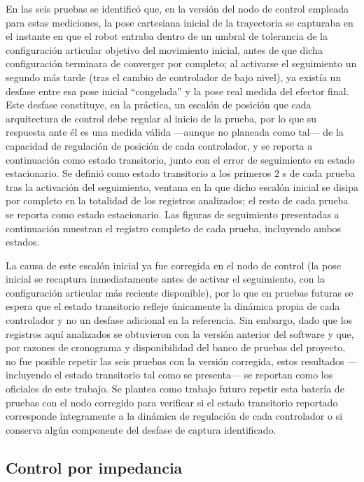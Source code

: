 En las seis pruebas se identificó que, en la versión del nodo de control
empleada para estas mediciones, la pose cartesiana inicial de la trayectoria
se capturaba en el instante en que el robot entraba dentro de un umbral de
tolerancia de la configuración articular objetivo del movimiento inicial,
antes de que dicha configuración terminara de converger por completo; al
activarse el seguimiento un segundo más tarde (tras el cambio de controlador
de bajo nivel), ya existía un desfase entre esa pose inicial ``congelada'' y
la pose real medida del efector final. Este desfase constituye, en la
práctica, un escalón de posición que cada arquitectura de control debe
regular al inicio de la prueba, por lo que su respuesta ante él es una
medida válida —aunque no planeada como tal— de la capacidad de regulación de
posición de cada controlador, y se reporta a continuación como estado
transitorio, junto con el error de seguimiento en estado estacionario. Se
definió como estado transitorio a los primeros \(2\) s de cada prueba tras la
activación del seguimiento, ventana en la que dicho escalón inicial se
disipa por completo en la totalidad de los registros analizados; el resto de
cada prueba se reporta como estado estacionario. Las figuras de seguimiento
presentadas a continuación muestran el registro completo de cada prueba,
incluyendo ambos estados.

La causa de este escalón inicial ya fue corregida en el nodo de control (la
pose inicial se recaptura inmediatamente antes de activar el seguimiento,
con la configuración articular más reciente disponible), por lo que en
pruebas futuras se espera que el estado transitorio refleje únicamente la
dinámica propia de cada controlador y no un desfase adicional en la
referencia. Sin embargo, dado que los registros aquí analizados se
obtuvieron con la versión anterior del software y que, por razones de
cronograma y disponibilidad del banco de pruebas del proyecto, no fue
posible repetir las seis pruebas con la versión corregida, estos
resultados —incluyendo el estado transitorio tal como se presenta— se
reportan como los oficiales de este trabajo. Se plantea como trabajo futuro
repetir esta batería de pruebas con el nodo corregido para verificar si el
estado transitorio reportado corresponde íntegramente a la dinámica de
regulación de cada controlador o si conserva algún componente del desfase de
captura identificado.

\subsection{Control por impedancia}

